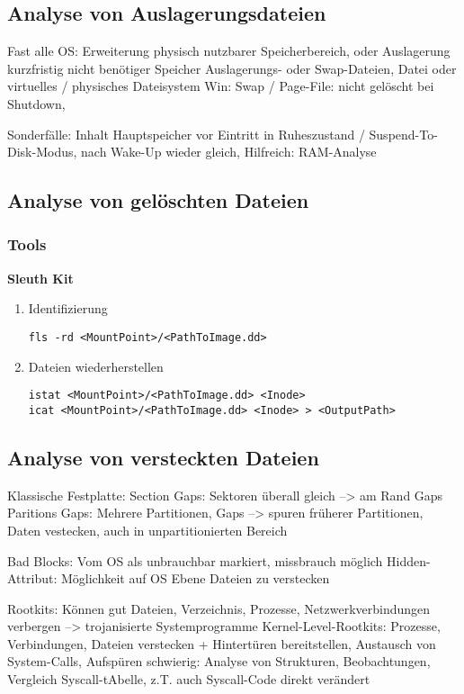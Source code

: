 \subsection{Analyse von Auslagerungsdateien}
Fast alle OS: Erweiterung physisch nutzbarer Speicherbereich, oder Auslagerung kurzfristig nicht benötiger Speicher
Auslagerungs- oder Swap-Dateien, Datei oder virtuelles / physisches Dateisystem
Win: Swap / Page-File: nicht gelöscht bei Shutdown, 

Sonderfälle: Inhalt Hauptspeicher vor Eintritt in Ruheszustand / Suspend-To-Disk-Modus, nach Wake-Up wieder gleich, Hilfreich: RAM-Analyse


\subsection{Analyse von gelöschten Dateien}

\subsubsection{Tools}
\textbf{Sleuth Kit}\\
\begin{enumerate}
\item Identifizierung
\begin{verbatim}
fls -rd <MountPoint>/<PathToImage.dd>
\end{verbatim}
\item Dateien wiederherstellen
\begin{verbatim}
istat <MountPoint>/<PathToImage.dd> <Inode>
icat <MountPoint>/<PathToImage.dd> <Inode> > <OutputPath>
\end{verbatim}
\end{enumerate}

\subsection{Analyse von versteckten Dateien}
Klassische Festplatte:
Section Gaps: Sektoren überall gleich --> am Rand Gaps
Paritions Gaps: Mehrere Partitionen, Gaps --> spuren früherer Partitionen, Daten vestecken, auch in unpartitionierten Bereich

Bad Blocks: Vom OS als unbrauchbar markiert, missbrauch möglich
Hidden-Attribut: Möglichkeit auf OS Ebene Dateien zu verstecken


Rootkits: Können gut Dateien, Verzeichnis, Prozesse, Netzwerkverbindungen verbergen --> trojanisierte Systemprogramme
Kernel-Level-Rootkits: Prozesse, Verbindungen, Dateien verstecken + Hintertüren bereitstellen, Austausch von System-Calls, Aufspüren schwierig: Analyse von Strukturen, Beobachtungen, Vergleich Syscall-tAbelle, z.T. auch Syscall-Code direkt verändert

